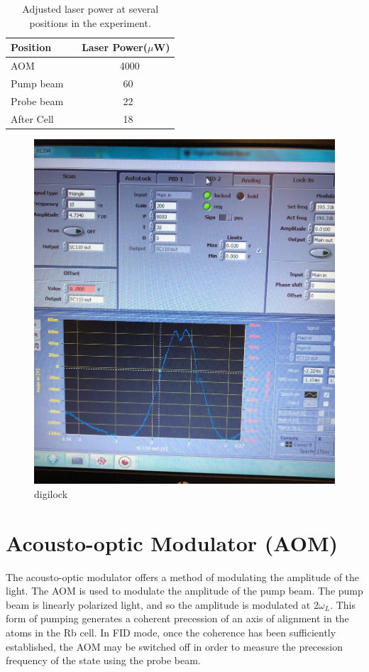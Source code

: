\begin{table}[h]
\centering
\begin{tabular}{|l | l|}
\hline

\textbf{ Position}    & \textbf{Laser Power($\mu$W)} \\
\hline

AOM ~&  ~ ~ ~ ~ ~4000  \\

Pump beam ~  &  ~ ~ ~ ~ ~ 60  \\

Probe beam ~  &  ~ ~ ~ ~ ~ 22  \\
After Cell ~ &  ~ ~ ~ ~ ~ 18   \\

\hline
\end{tabular}
\caption{Adjusted laser power at several positions in the experiment.\label{table:laser power}}
\end{table}
\begin{figure}[h]
\centering
\includegraphics[width=0.6\linewidth]{figures/digilock.jpg}
\caption{digilock\label{fig:digilock}}
\end{figure}
\section{Acousto-optic Modulator (AOM)\label{sec:AOM}}

The acousto-optic modulator offers a method of modulating the
amplitude of the light.
The AOM is used to modulate the amplitude of the pump beam. The pump beam is linearly polarized light, and so the amplitude
  is modulated at $2\omega_L$. This form of pumping generates a coherent precession of an axis of alignment in the atoms in the Rb cell. In FID mode, once the coherence has been sufficiently established, the AOM may be switched off in order to measure the precession frequency of the state using the probe beam.

